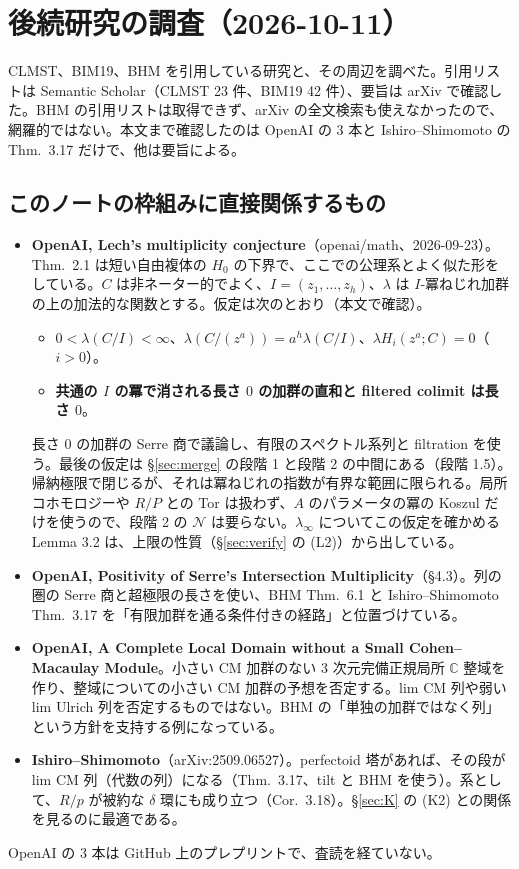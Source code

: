 \documentclass[11pt,a4paper]{ltjsarticle}
\theoremstyle{plain}
\theoremstyle{definition}
\theoremstyle{remark}
\theoremstyle{plain}
\begin{document}
\section{後続研究の調査（2026-10-11）}\label{sec:followup}

CLMST、BIM19、BHM を引用している研究と、その周辺を調べた。引用リストは Semantic Scholar（CLMST 23 件、BIM19 42 件）、要旨は arXiv で確認した。BHM の引用リストは取得できず、arXiv の全文検索も使えなかったので、網羅的ではない。本文まで確認したのは OpenAI の 3 本と Ishiro--Shimomoto の Thm.~3.17 だけで、他は要旨による。

\subsection{このノートの枠組みに直接関係するもの}
\begin{itemize}
  \item \textbf{OpenAI, Lech's multiplicity conjecture}（openai/math、2026-09-23）。Thm.~2.1 は短い自由複体の $H_0$ の下界で、ここでの公理系とよく似た形をしている。$C$ は非ネーター的でよく、$I = (z_1,\dots,z_h)$、$\lambda$ は $I$-冪ねじれ加群の上の加法的な関数とする。仮定は次のとおり（本文で確認）。
  \begin{itemize}
    \item $0<\lambda(C/I)<\infty$、$\lambda(C/(z^a)) = a^h\lambda(C/I)$、$\lambda H_i(z^a;C) = 0$（$i>0$）。
    \item \textbf{共通の $I$ の冪で消される長さ $0$ の加群の直和と filtered colimit は長さ $0$}。
  \end{itemize}
  長さ $0$ の加群の Serre 商で議論し、有限のスペクトル系列と filtration を使う。最後の仮定は \S\ref{sec:merge} の段階 1 と段階 2 の中間にある（段階 1.5）。帰納極限で閉じるが、それは冪ねじれの指数が有界な範囲に限られる。局所コホモロジーや $R/P$ との Tor は扱わず、$A$ のパラメータの冪の Koszul だけを使うので、段階 2 の $\mathcal{N}$ は要らない。$\lambda_\infty$ についてこの仮定を確かめる Lemma 3.2 は、上限の性質（\S\ref{sec:verify} の (L2)）から出している。
  \item \textbf{OpenAI, Positivity of Serre's Intersection Multiplicity}（\S 4.3）。列の圏の Serre 商と超極限の長さを使い、BHM Thm.~6.1 と Ishiro--Shimomoto Thm.~3.17 を「有限加群を通る条件付きの経路」と位置づけている。
  \item \textbf{OpenAI, A Complete Local Domain without a Small Cohen--Macaulay Module}。小さい CM 加群のない 3 次元完備正規局所 $\mathbb{C}$ 整域を作り、整域についての小さい CM 加群の予想を否定する。lim CM 列や弱い lim Ulrich 列を否定するものではない。BHM の「単独の加群ではなく列」という方針を支持する例になっている。
  \item \textbf{Ishiro--Shimomoto}（arXiv:2509.06527）。perfectoid 塔があれば、その段が lim CM 列（代数の列）になる（Thm.~3.17、tilt と BHM を使う）。系として、$R/p$ が被約な $\delta$ 環にも成り立つ（Cor.~3.18）。\S\ref{sec:K} の (K2) との関係を見るのに最適である。
\end{itemize}
OpenAI の 3 本は GitHub 上のプレプリントで、査読を経ていない。
\end{document}
